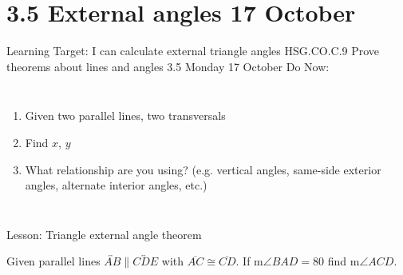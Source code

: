 \section{3.5 External angles \hfill 17 October}
\begin{frame}{Learning Target: I can calculate external triangle angles}
  {HSG.CO.C.9 Prove theorems about lines and angles  \hfill \alert{3.5 Monday 17 October}}
  Do Now: 
  \begin{columns}
    \begin{enumerate}
      \item Given two parallel lines, two transversals
      \item Find $x$, $y$
      \item What relationship are you using? (e.g. vertical angles, same-side exterior angles, alternate interior angles, etc.)
    \end{enumerate}
  \end{columns}
  Lesson: Triangle external angle theorem
\end{frame}

\begin{frame}
  Given parallel lines $\overleftrightarrow{AB} \parallel \overleftrightarrow{CDE}$ with $\overline{AC} \cong \overline{CD}$. If m$\angle BAD=80$ find m$\angle ACD$.
  \begin{flushright}
  \end{flushright} \vspace{1cm}
  \end{frame}


